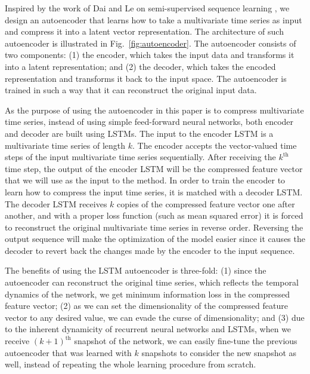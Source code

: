 Inspired by the work of Dai and Le on semi-supervised sequence learning \cite{dai2015semi}, we design an autoencoder that learns how to take a multivariate time series as input and compress it into a latent vector representation. The architecture of such autoencoder is illustrated in Fig.~\ref{fig:autoencoder}. The autoencoder consists of two components: (1) the encoder, which takes the input data and transforms it into a latent representation; and (2) the decoder, which takes the encoded representation and transforms it back to the input space. The autoencoder is trained in such a way that it can reconstruct the original input data. 

As the purpose of using the autoencoder in this paper is to compress multivariate time series, instead of using simple feed-forward neural networks, both encoder and decoder are built using LSTMs. The input to the encoder LSTM is a multivariate time series of length $k$. The encoder accepts the vector-valued time steps of the input multivariate time series sequentially. After receiving the $k^{\text{th}}$ time step, the output of the encoder LSTM will be the compressed feature vector that we will use as the input to the \npglm method. In order to train the encoder to learn how to compress the input time series, it is matched with a decoder LSTM. The decoder LSTM receives $k$ copies of the compressed feature vector one after another, and with a proper loss function (such as mean squared error) it is forced to reconstruct the original multivariate time series in reverse order. Reversing the output sequence will make the optimization of the model easier since it causes the decoder to revert back the changes made by the encoder to the input sequence.

The benefits of using the LSTM autoencoder is three-fold: (1) since the autoencoder can reconstruct the original time series, which reflects the temporal dynamics of the network, we get minimum information loss in the compressed feature vector; (2) as we can set the dimensionality of the compressed feature vector to any desired value, we can evade the curse of dimensionality; and (3) due to the inherent dynamicity of recurrent neural networks and LSTMs, when we receive $(k+1)^{\text{th}}$ snapshot of the network, we can easily fine-tune the previous autoencoder that was learned with $k$ snapshots to consider the new snapshot as well, instead of repeating the whole learning procedure from scratch.



